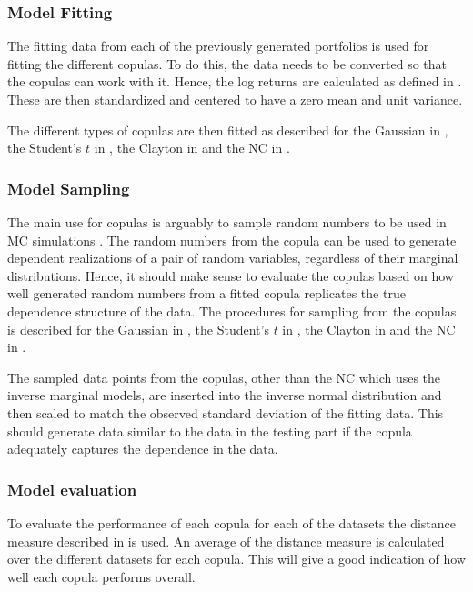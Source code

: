 \subsubsection{Model Fitting}
The fitting data from each of the previously generated portfolios is used for fitting the different copulas. To do this, the data needs to be converted so that the copulas can work with it. Hence, the log returns are calculated as defined in . These are then standardized and centered to have a zero mean and unit variance. 

The different types of copulas are then fitted as described for the Gaussian in , the Student's $t$ in , the Clayton in  and the \gls{NC} in . 


\subsubsection{Model Sampling}
The main use for copulas is arguably to sample random numbers to be used in \gls{MC} simulations . The random numbers from the copula can be used to generate dependent realizations of a pair of random variables, regardless of their marginal distributions. Hence, it should make sense to evaluate the copulas based on how well generated random numbers from a fitted copula replicates the true dependence structure of the data. The procedures for sampling from the copulas is described for the Gaussian in , the Student's $t$ in , the Clayton in  and the \gls{NC} in . 

The sampled data points from the copulas, other than the \gls{NC} which uses the inverse marginal models, are inserted into the inverse normal distribution and then scaled to match the observed standard deviation of the fitting data. This should generate data similar to the data in the testing part if the copula adequately captures the dependence in the data.

\subsubsection{Model evaluation}
To evaluate the performance of each copula for each of the datasets the distance measure described in  is used. An average of the distance measure is calculated over the different datasets for each copula. This will give a good indication of how well each copula performs overall. 





